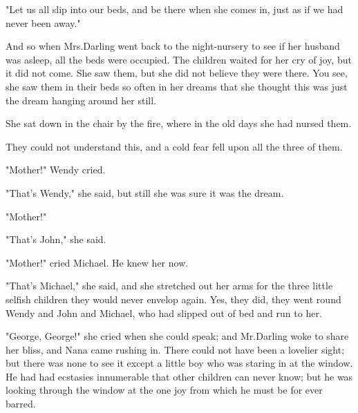 "Let us all slip into our beds, and be there when she comes in, just as if we had never been away."

And so when Mrs.\@ Darling went back to the night-nursery to see if her husband was asleep, all the beds were occupied.
The children waited for her cry of joy, but it did not come.
She saw them, but she did not believe they were there.
You see, she saw them in their beds so often in her dreams that she thought this was just the dream hanging around her still.

She sat down in the chair by the fire, where in the old days she had nursed them.

They could not understand this, and a cold fear fell upon all the three of them.

"Mother!\@" Wendy cried.

"That's Wendy," she said, but still she was sure it was the dream.

"Mother!"

"That's John," she said.

"Mother!\@" cried Michael.
He knew her now.

"That's Michael," she said, and she stretched out her arms for the three little selfish children they would never envelop again.
Yes, they did, they went round Wendy and John and Michael, who had slipped out of bed and run to her.

"George, George!\@" she cried when she could speak;
and Mr.\@ Darling woke to share her bliss, and Nana came rushing in.
There could not have been a lovelier sight;
but there was none to see it except a little boy who was staring in at the window.
He had had ecstasies innumerable that other children can never know;
but he was looking through the window at the one joy from which he must be for ever barred.
